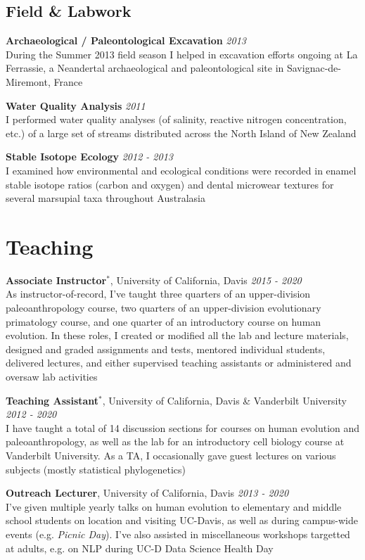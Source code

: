 \documentclass[12pt]{article}
\begin{document}
\subsection{Field \& Labwork}

\textbf{Archaeological / Paleontological Excavation} \hfill \emph{2013}\\
During the Summer 2013 field season I helped in excavation efforts ongoing at La Ferrassie, a Neandertal archaeological and paleontological site in Savignac-de-Miremont, France

\textbf{Water Quality Analysis} \hfill \emph{2011}\\
I performed water quality analyses (of salinity, reactive nitrogen concentration, etc.) of a large set of streams distributed across the North Island of New Zealand

\textbf{Stable Isotope Ecology} \hfill \emph{2012 - 2013}\\
I examined how environmental and ecological conditions were recorded in enamel stable isotope ratios (carbon and oxygen) and dental microwear textures for several marsupial taxa throughout Australasia

\section{Teaching}

\textbf{Associate Instructor$^{*}$}, University of California, Davis \hfill \emph{2015  - 2020}\\
As instructor-of-record, I’ve taught three quarters of an upper-division paleoanthropology course, two quarters of an upper-division evolutionary primatology course, and one quarter of an introductory course on human evolution. In these roles, I created or modified all the lab and lecture materials, designed and graded assignments and tests, mentored individual students, delivered lectures, and either supervised teaching assistants or administered and oversaw lab activities

\textbf{Teaching Assistant$^{*}$}, University of California, Davis \& Vanderbilt University \hfill \emph{2012  - 2020}\\
I have taught a total of 14 discussion sections for courses on human evolution and paleoanthropology, as well as the lab for an introductory cell biology course at Vanderbilt University. As a TA, I occasionally gave guest lectures on various subjects (mostly statistical phylogenetics)

\textbf{Outreach Lecturer}, University of California, Davis \hfill \emph{2013  - 2020}\\
I've given multiple yearly talks on human evolution to elementary and middle school students on location and visiting UC-Davis, as well as during campus-wide events (e.g. \emph{Picnic Day}). I've also assisted in miscellaneous workshops targetted at adults, e.g. on NLP during UC-D Data Science Health Day
\end{document}
